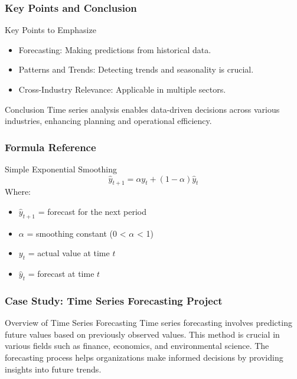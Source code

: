 \documentclass[aspectratio=169]{beamer}
\begin{document}
\begin{frame}[fragile]
    \frametitle{Key Points and Conclusion}
    \begin{block}{Key Points to Emphasize}
        \begin{itemize}
            \item Forecasting: Making predictions from historical data.
            \item Patterns and Trends: Detecting trends and seasonality is crucial.
            \item Cross-Industry Relevance: Applicable in multiple sectors.
        \end{itemize}
    \end{block}
    
    \begin{block}{Conclusion}
    Time series analysis enables data-driven decisions across various industries, enhancing planning and operational efficiency.
    \end{block}
\end{frame}

\begin{frame}[fragile]
    \frametitle{Formula Reference}
    \begin{block}{Simple Exponential Smoothing}
        \begin{equation}
            \hat{y}_{t+1} = \alpha y_t + (1 - \alpha) \hat{y}_t
        \end{equation}
        Where:
        \begin{itemize}
            \item \( \hat{y}_{t+1} \) = forecast for the next period
            \item \( \alpha \) = smoothing constant (0 < \( \alpha \) < 1)
            \item \( y_t \) = actual value at time \( t \)
            \item \( \hat{y}_t \) = forecast at time \( t \)
        \end{itemize}
    \end{block}
\end{frame}

\begin{frame}[fragile]
    \frametitle{Case Study: Time Series Forecasting Project}
    \begin{block}{Overview of Time Series Forecasting}
        Time series forecasting involves predicting future values based on previously observed values. This method is crucial in various fields such as finance, economics, and environmental science. 
        The forecasting process helps organizations make informed decisions by providing insights into future trends.
    \end{block}
\end{frame}
\end{document}
